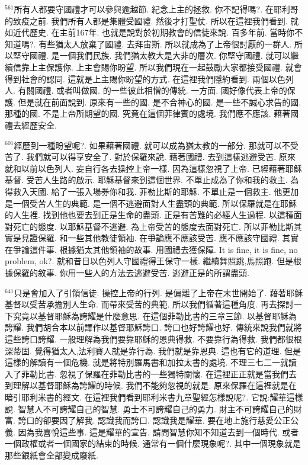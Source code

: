 \documentclass{book}
\begin{document}
$^{561}$所有人都要守國禮才可以參與逾越節.
紀念上主的拯救.
你不記得嗎?.
在耶利哥的致疫之前.
我們所有人都是集體受國禮.
然後才打聖仗.
所以在這裡我們看到.
就如近代歷史.
在主前167年.
也就是說對於初期教會的信徒來說.
百多年前.
當時你不知道嗎?.
有些猶太人放棄了國禮.
去拜宙斯.
所以就成為了上帝很討厭的一群人.
所以堅守國禮.
是一個我們民族.
我們猶太教大是大非的層次.
你堅守國禮.
就可以繼續信靠上主保護你.
上主會賜你盼望.
所以我們現在一起鼓勵大家都接受國禮.
就會得到社會的認同.
這就是上主賜你盼望的方式.
在這裡我們隱約看到.
兩個以色列人.
有關國禮.
或者叫做國.
的一些彼此相憎的傳統.
一方面.
國好像代表上帝的保護.
但是就在前面說到.
原來有一些的國.
是不合神心的國.
是一些不誠心求告的國.
那種的國.
不是上帝所期望的國.
究竟在這個菲律賓的處境.
我們應不應該.
藉著國禮去經歷安全.

$^{601}$經歷到一種盼望呢?.
如果藉著國禮.
就可以成為猶太教的一部分.
那就可以不受苦了.
我們就可以得享安全了.
對於保羅來說.
藉著國禮.
去到這樣逃避受苦.
原來就和以前以色列人.
妄自行各去操控上帝一樣.
因為這樣忽視了上帝.
已經藉著耶穌基督.
受苦人生路的啟示.
耶穌基督來到這個世界.
不單止成為了你和我的救主.
為得救入天國.
給了一張入場券你和我.
菲勒比斯的耶穌.
不單止是一個救主.
他更加是一個受苦人生的典範.
是一個不逃避面對人生盡頭的典範.
所以保羅就是在耶穌的人生裡.
找到他也要去到正是生命的盡頭.
正是有苦難的必經人生過程.
以這種面對死亡的態度.
以耶穌基督不逃避.
為上帝受苦的態度去面對死亡.
所以菲勒比斯其實是見證保羅.
和一些其他教徒領袖.
在爭論應不應該受苦.
應不應該守國禮.
其實在爭論這件事.
根據猶太其他領袖的故事.
用國禮去獲保障.
It is fine, it is fine, no problem, ok?.
就和昔日以色列人守國禮得王保守一樣.
繼續舞照跳,馬照跑.
但是根據保羅的敘事.
你用一些人的方法去逃避受苦.
逃避正是的所謂盡頭.

$^{641}$只是會加入了引領信徒.
操控上帝的行列.
是偏離了上帝在末世開始了.
藉著耶穌基督以受苦承擔別人生命.
而帶來受苦的典範.
所以我們循著這種角度.
再去探討一下究竟以基督耶穌為誇耀是什麼意思.
在這個菲勒比書的三章三節.
以基督耶穌為誇耀.
我們胡合本以前譯作以基督耶穌誇口.
誇口也好誇耀也好.
傳統來說我們就將這些誇口誇耀.
一般理解為我們要靠耶穌的恩典得救.
不要靠行為得救.
我們都很根深蒂固.
覺得猶太人,法利賽人就是靠行為.
我們就是靠恩典.
這也有它的道理.
但是這樣的解讀有一個危機.
就是將特別羅馬書和加拉太書的處境.
不理三七二一就讀入了菲勒比書.
忽視了保羅在菲勒比書的一些獨特關懷.
在這裡正正就是當我們去到理解以基督耶穌為誇耀的時候.
我們不能夠忽視的就是.
原來保羅在這裡就是在暗引耶利米書的經文.
在這裡我們看到耶利米書九章聖經怎樣說呢?.
它說:耀華這樣說.
智慧人不可誇耀自己的智慧.
勇士不可誇耀自己的勇力.
財主不可誇耀自己的財富.
誇口的卻要因了解我.
認識我而誇口.
認識我是耀華.
要在地上施行慈愛公正公義.
因為我喜悅這些事.
這是耀華的宣告.
請問智慧你知不知道去到一個時代.
或者一個政權或者一個國家的結束的時候.
通常有一個什麼現象呢?.
其中一個現象就是那些銀紙會全部變成廢紙.
\end{document}
